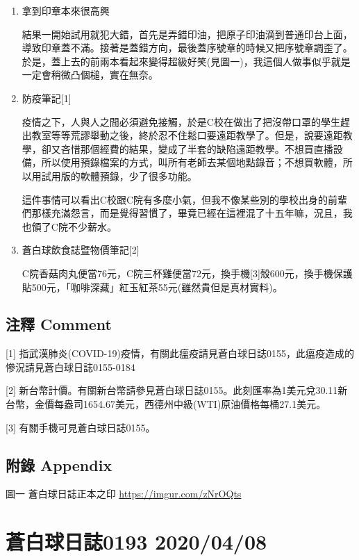 \documentclass[
]{article}
\begin{document}
\begin{enumerate}
\def\labelenumi{\arabic{enumi}.}
\item
  拿到印章本來很高興

  結果一開始試用就犯大錯，首先是弄錯印油，把原子印油滴到普通印台上面，導致印章蓋不滿。接著是蓋錯方向，最後蓋序號章的時候又把序號章調歪了。於是，蓋上去的前兩本看起來變得超級好笑(見圖一)，我這個人做事似乎就是一定會稍微凸個槌，實在無奈。
\item
  防疫筆記{[}1{]}

  疫情之下，人與人之間必須避免接觸，於是C校在做出了把沒帶口罩的學生趕出教室等等荒謬舉動之後，終於忍不住鬆口要遠距教學了。但是，說要遠距教學，卻又吝惜那個經費的結果，變成了半套的缺陷遠距教學。不想買直播設備，所以使用預錄檔案的方式，叫所有老師去某個地點錄音；不想買軟體，所以用試用版的軟體預錄，少了很多功能。

  這件事情可以看出C校跟C院有多麼小氣，但我不像某些別的學校出身的前輩們那樣充滿怨言，而是覺得習慣了，畢竟已經在這裡混了十五年嘛，況且，我也領了C院不少薪水。
\item
  蒼白球飲食誌暨物價筆記{[}2{]}

  C院香菇肉丸便當76元，C院三杯雞便當72元，換手機{[}3{]}殼600元，換手機保護貼500元，「咖啡深藏」紅玉紅茶55元(雖然貴但是真材實料)。
\end{enumerate}

\hypertarget{ux6ce8ux91cb-comment-6}{%
\subsection{注釋 Comment}\label{ux6ce8ux91cb-comment-6}}

{[}1{]}
指武漢肺炎(COVID-19)疫情，有關此瘟疫請見蒼白球日誌0155，此瘟疫造成的慘況請見蒼白球日誌0155-0184

{[}2{]}
新台幣計價。有關新台幣請參見蒼白球日誌0155。此刻匯率為1美元兌30.11新台幣，金價每盎司1654.67美元，西德州中級(WTI)原油價格每桶27.1美元。

{[}3{]} 有關手機可見蒼白球日誌0155。

\hypertarget{ux9644ux9304-appendix-6}{%
\subsection{附錄 Appendix}\label{ux9644ux9304-appendix-6}}

圖一 蒼白球日誌正本之印 \url{https://imgur.com/zNrOQts}

\hypertarget{ux84bcux767dux7403ux65e5ux8a8c0193-20200408}{%
\section{蒼白球日誌0193
2020/04/08}\label{ux84bcux767dux7403ux65e5ux8a8c0193-20200408}}
\end{document}
